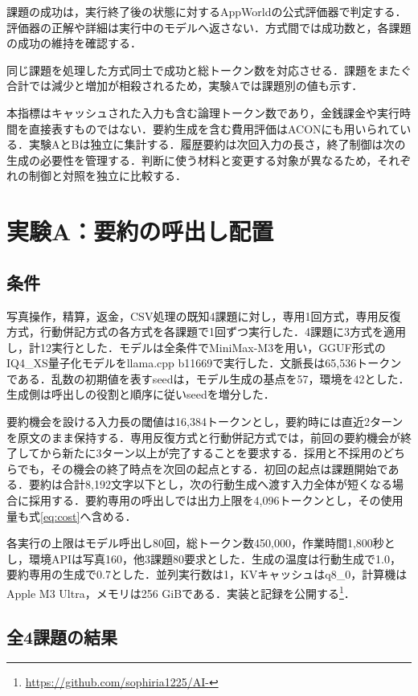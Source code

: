\documentclass[letter]{ieicej}
\begin{document}
課題の成功は，実行終了後の状態に対するAppWorld\cite{trivedi2024appworld}の公式評価器で判定する．評価器の正解や詳細は実行中のモデルへ返さない．方式間では成功数と，各課題の成功の維持を確認する．

同じ課題を処理した方式同士で成功と総トークン数を対応させる．課題をまたぐ合計では減少と増加が相殺されるため，実験Aでは課題別の値も示す．

本指標はキャッシュされた入力も含む論理トークン数であり，金銭課金や実行時間を直接表すものではない\cite{xu2026tokenpilot}．要約生成を含む費用評価はACON\cite{kang2026acon}にも用いられている．実験AとBは独立に集計する．履歴要約は次回入力の長さ，終了制御は次の生成の必要性を管理する．判断に使う材料と変更する対象が異なるため，それぞれの制御と対照を独立に比較する．

\section{実験A：要約の呼出し配置}

\subsection{条件}

写真操作，精算，返金，CSV処理の既知4課題に対し，専用1回方式，専用反復方式，行動併記方式の各方式を各課題で1回ずつ実行した．4課題に3方式を適用し，計12実行とした．モデルは全条件でMiniMax-M3を用い，GGUF形式のIQ4\_XS量子化モデルをllama.cpp b11669で実行した．文脈長は65,536トークンである．乱数の初期値を表すseedは，モデル生成の基点を57，環境を42とした．生成側は呼出しの役割と順序に従いseedを増分した．

要約機会を設ける入力長の閾値は16,384トークンとし，要約時には直近2ターンを原文のまま保持する．専用反復方式と行動併記方式では，前回の要約機会が終了してから新たに3ターン以上が完了することを要求する．採用と不採用のどちらでも，その機会の終了時点を次回の起点とする．初回の起点は課題開始である．要約は合計8,192文字以下とし，次の行動生成へ渡す入力全体が短くなる場合に採用する．要約専用の呼出しでは出力上限を4,096トークンとし，その使用量も式\eqref{eq:cost}へ含める．

各実行の上限はモデル呼出し80回，総トークン数450,000，作業時間1,800秒とし，環境APIは写真160，他3課題80要求とした．生成の温度は行動生成で1.0，要約専用の生成で0.7とした．並列実行数は1，KVキャッシュはq8\_0，計算機はApple M3 Ultra，メモリは256 GiBである．実装と記録を公開する\footnote{\url{https://github.com/sophiria1225/AI-}}．

\subsection{全4課題の結果}
\end{document}
